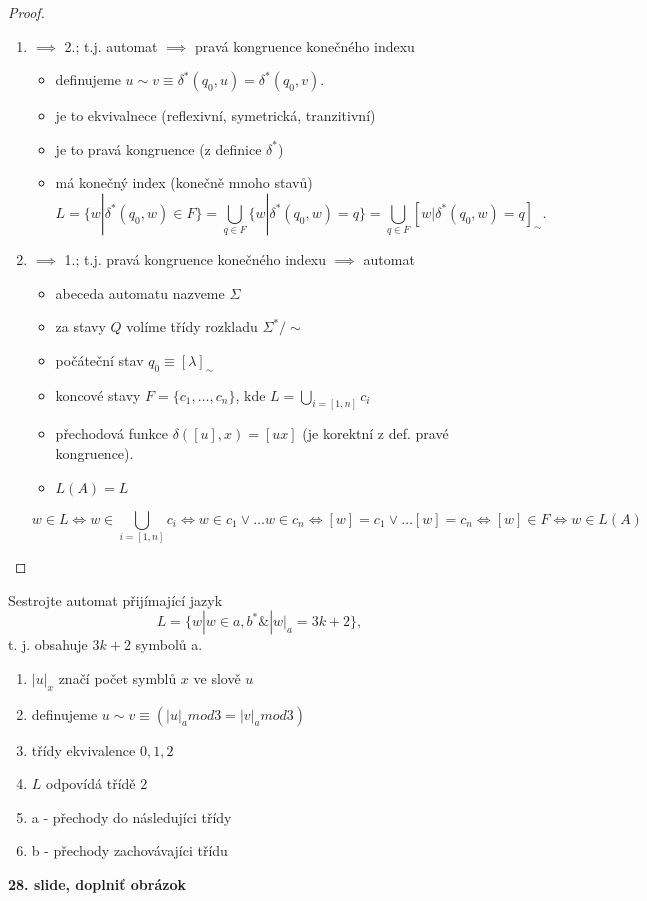 \documentclass[../main.tex]{subfiles}
\begin{document}
\begin{proof}
\begin{enumerate}
    \item $\implies$ 2.; t.j. automat $\implies$ pravá kongruence konečného indexu
    \begin{itemize}
        \item definujeme $u \sim v \equiv \delta^*(q_0,u) = \delta^*(q_0,v)$.
        \item je to ekvivalnece (reflexivní, symetrická, tranzitivní)
        \item je to pravá kongruence (z definice $\delta^*$)
        \item má konečný index (konečně mnoho stavů)
        \[L = \{w|\delta^* (q_0,w)\in F\} = \bigcup_{q\in F} \{w|\delta^*(q_0,w) = q\}
         = \bigcup_{q\in F}[w|\delta^*(q_0,w) = q]_{\sim}.\]
    \end{itemize}

    \noindent
    \item $\implies$ 1.; t.j. pravá kongruence konečného indexu $\implies$ automat
    \begin{itemize}
        \item abeceda automatu nazveme $\Sigma$
        \item za stavy $Q$ volíme třídy rozkladu $\Sigma^*/\sim$
        \item počáteční stav $q_0 \equiv [\lambda]_\sim$
        \item koncové stavy $F=\{c_1,\dots,c_n\}$, kde $L=\bigcup_{i=[1,n]}c_i$
        \item přechodová funkce $\delta([u],x) = [ux]$ (je korektní z def. pravé kongruence).
        \item $L(A) = L$
    \end{itemize}
    \[w\in L \Leftrightarrow w\in \bigcup_{i=[1,n]}c_i \Leftrightarrow w\in c_1 \vee \dots w \in
    c_n \Leftrightarrow [w] = c_1 \vee \dots [w] = c_n \Leftrightarrow [w]\in F \Leftrightarrow w \in L(A)\]
\end{enumerate}
\end{proof}

\begin{example}
    Sestrojte automat přijímající jazyk
    \[L = \{w|w \in {a,b}^* \& |w|_a = 3k + 2\},\]
    t. j. obsahuje $3k+2$ symbolů a.
    \begin{enumerate}
        \item $|u|_x$ značí počet symblů $x$ ve slově $u$
        \item definujeme $u \sim v \equiv (|u|_a mod 3 = |v|_a mod 3)$
        \item třídy ekvivalence $0,1,2$
        \item $L$ odpovídá třídě $2$
        \item a - přechody do následujíci třídy
        \item b - přechody zachovávajíci třídu
    \end{enumerate}
    \textbf{28. slide, doplniť obrázok}
\end{example}
\end{document}
